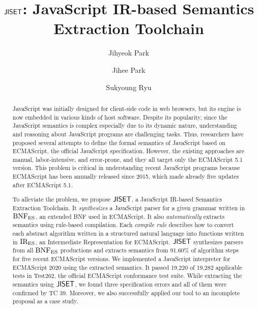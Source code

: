 \documentclass[sigconf,review,anonymous]{acmart}
\begin{document}
\title{\( \text{\sf JISET} \): JavaScript IR-based Semantics Extraction Toolchain}

\author{Jihyeok Park}

\author{Jihee Park}

\author{Sukyoung Ryu}

\begin{abstract}
JavaScript was initially designed for client-side code in web browsers,
but its engine is now embedded in various kinds of host software.
Despite its popularity, since the JavaScript semantics is complex
especially due to its dynamic nature, understanding and reasoning
about JavaScript programs are challenging tasks.  Thus,
researchers have proposed several attempts to define the formal semantics
of JavaScript based on ECMAScript, the official JavaScript specification.
However, the existing approaches are manual, labor-intensive, and
error-prone, and they all target only the ECMAScript 5.1 version.
This problem is critical in understanding recent JavaScript programs
because ECMAScript has been annually released since 2015, which made
already five updates after ECMAScript 5.1.

To alleviate the problem, we propose \( \text{\sf JISET} \), a JavaScript IR-based Semantics
Extraction Toolchain. It \textit{synthesizes} a JavaScript
parser for a given grammar written in \( \text{BNF}_{\text{ES}} \), an extended BNF
used in ECMAScript. It also \textit{automatically} extracts
semantics using rule-based compilation. Each \textit{compile rule}
describes how to convert each abstract algorithm written in a structured natural language
into functions written in \( \text{IR}_\text{ES} \), an Intermediate Representation
for ECMAScript. \( \text{\sf JISET} \) synthesizes parsers from all \( \text{BNF}_{\text{ES}} \) productions
and extracts semantics from 91.60\% of algorithm steps for five recent
ECMAScript versions.  We implemented a JavaScript interpreter for ECMAScript 2020
using the extracted semantics.  It passed 19,220 of 19,282 applicable tests
in Test262, the official ECMAScript conformance test suite. While extracting
the semantics using \( \text{\sf JISET} \), we found three specification errors
and all of them were confirmed by TC 39. Moreover, we also successfully applied
our tool to an incomplete proposal as a case study.
\end{abstract}


\maketitle










\normalem


\end{document}
